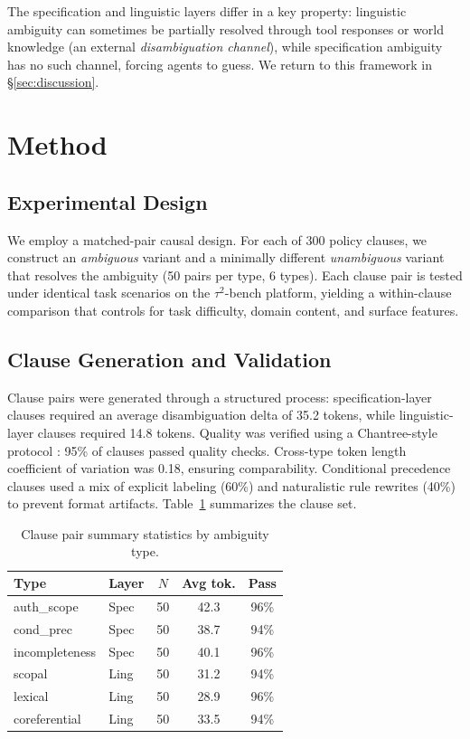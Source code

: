 \documentclass[11pt,a4paper]{article}
\begin{document}
The specification and linguistic layers differ in a key property: linguistic ambiguity can sometimes be partially resolved through tool responses or world knowledge (an external \textit{disambiguation channel}), while specification ambiguity has no such channel, forcing agents to guess. We return to this framework in \S\ref{sec:discussion}.

\section{Method}
\label{sec:method}

\subsection{Experimental Design}

We employ a matched-pair causal design. For each of 300 policy clauses, we construct an \textit{ambiguous} variant and a minimally different \textit{unambiguous} variant that resolves the ambiguity (50 pairs per type, 6 types). Each clause pair is tested under identical task scenarios on the $\tau^2$-bench \cite{yao2024tau2bench} platform, yielding a within-clause comparison that controls for task difficulty, domain content, and surface features.

\subsection{Clause Generation and Validation}
\label{sec:clause-gen}

Clause pairs were generated through a structured process: specification-layer clauses required an average disambiguation delta of 35.2 tokens, while linguistic-layer clauses required 14.8 tokens. Quality was verified using a Chantree-style protocol \cite{chantree2006identifying}: 95\% of clauses passed quality checks. Cross-type token length coefficient of variation was 0.18, ensuring comparability. Conditional precedence clauses used a mix of explicit labeling (60\%) and naturalistic rule rewrites (40\%) to prevent format artifacts. Table~\ref{tab:clause-summary} summarizes the clause set.

\begin{table}[t]
\centering
\small
\caption{Clause pair summary statistics by ambiguity type.}
\label{tab:clause-summary}
\begin{tabular}{llccc}
\toprule
Type & Layer & $N$ & Avg tok. & Pass \\
\midrule
auth\_scope & Spec & 50 & 42.3 & 96\% \\
cond\_prec & Spec & 50 & 38.7 & 94\% \\
incompleteness & Spec & 50 & 40.1 & 96\% \\
scopal & Ling & 50 & 31.2 & 94\% \\
lexical & Ling & 50 & 28.9 & 96\% \\
coreferential & Ling & 50 & 33.5 & 94\% \\
\bottomrule
\end{tabular}
\end{table}
\end{document}
